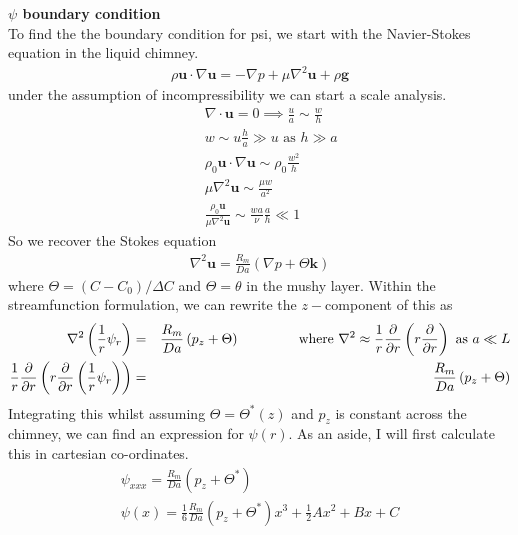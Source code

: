 \documentclass{article}
\begin{document}
\textbf{$\psi$ boundary condition} \\
To find the the boundary condition for psi, we start with the Navier-Stokes equation in the liquid chimney.
\begin{eqnarray}
\rho \mathbf{u}\cdot \nabla \mathbf{u} = - \nabla p + \mu \nabla^2 \mathbf{u} + \rho \mathbf{g}
\end{eqnarray}
under the assumption of incompressibility we can start a scale analysis.
\begin{eqnarray}
&& \nabla \cdot \mathbf{u} = 0 \implies \frac{u}{a} \sim \frac{w}{h} \\
&& w \sim u \frac{h}{a} \gg u \text{ as } h \gg a\\
&&\rho_0 \mathbf{u} \cdot \nabla \mathbf{u} \sim \rho_0 \frac{w^2}{h} \\
&&\mu \nabla^2 \mathbf{u} \sim \frac{\mu w}{a^2}\\
&&\frac{\rho_0 \mathbf{u}}{\mu \nabla^2 \mathbf{u}} \sim \frac{w a}{\nu}\frac{a}{h} \ll 1
\end{eqnarray}
So we recover the Stokes equation
\begin{eqnarray}
\nabla^2 \mathbf{u} = \frac{R_m}{Da} (\nabla p + \Theta \mathbf{k})
\end{eqnarray}
where $\Theta = (C-C_0)/\Delta C$ and $\Theta = \theta$ in the mushy layer. Within the streamfunction formulation, we can rewrite the $z-$component of this as
\begin{eqnarray}
\nabla^2 \left( \frac{1}{r} \psi_r \right) &=& \frac{R_m}{Da} \left( p_z + \Theta \right) \hspace{10ex} \text{where } \nabla^2 \approx \frac{1}{r} \frac{\partial}{\partial r} \left(r \frac{\partial}{\partial r} \right) \text{ as } a \ll L \\
\frac{1}{r} \frac{\partial}{\partial r} \left( r \frac{\partial}{\partial r} \left(\frac{1}{r} \psi_r \right) \right) &=& \frac{R_m}{Da} \left( p_z + \Theta \right) \\
\end{eqnarray}
Integrating this whilst assuming $\Theta = \Theta^*(z)$ and $p_z$ is constant across the chimney, we can find an expression for $\psi(r)$. As an aside, I will first calculate this in cartesian co-ordinates.
\begin{eqnarray}
\psi_{xxx} = \frac{R_m}{Da} \left( p_z + \Theta^* \right)  \\
\psi(x) = \frac{1}{6} \frac{R_m}{Da} \left( p_z + \Theta^* \right) x^3 + \frac{1}{2} A x^2 + B x + C
\end{eqnarray}
\end{document}
